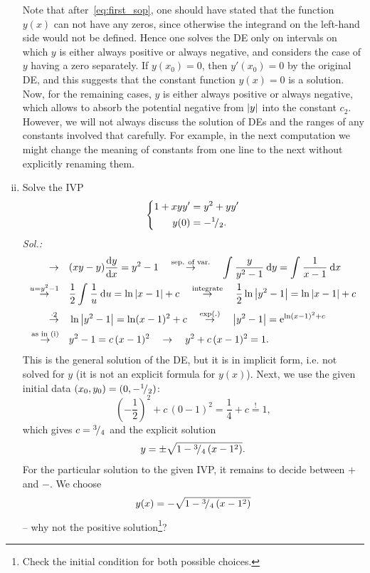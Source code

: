 \begin{example}
\begin{enumerate}[(i)]
	Note that after~\eqref{eq:first_sop}, one should have stated that the function $y(x)$ can not have any zeros, since otherwise the integrand on the left-hand side would not be defined. Hence one solves the DE only on intervals on which $y$ is either always positive or always negative, and considers the case of $y$ having a zero separately. If $y(x_0)=0$, then $y'(x_0)=0$ by the original DE, and this suggests that the constant function $y(x)=0$ is a solution. Now, for the remaining cases, $y$ is either always positive or always negative, which allows to absorb the potential negative from $\left| y \right|$ into the constant $c_2$. However, we will not always discuss the solution of DEs and the ranges of any constants involved that carefully. For example, in the next computation we might change the meaning of constants from one line to the next without explicitly renaming them.
	\item Solve the IVP
	\[ \left\{ \begin{split} 1+xyy' & = y^2+yy' \\ y(0) & = -{}^{1}\!/_{2}. \end{split} \right. \]
	{\it Sol.:}
	\begin{equation*}
	\begin{split}
	\rightarrow & \quad (xy-y)\displaystyle{\frac{\mathrm{d}y}{\mathrm{d}x}} 
	= y^2-1 \quad \stackrel{\text{sep. of var.}}{\rightarrow} \quad
	\int_{}^{} \frac{y}{y^2-1} \: \mathrm{d} y = \int_{}^{} \frac{1}{x-1} \: \mathrm{d} x \\
	\stackrel{u=y^2-1}{\rightarrow} & \quad \frac12 \int_{}^{} \frac1u \: \mathrm{d} u = \ln\left| x-1 \right|+c \quad
	\stackrel{\text{integrate}}{\rightarrow} \quad \frac12\ln\left| y^2-1 \right| = \ln\left| x-1 \right| + c \\ 
	\stackrel{\cdot 2}{\rightarrow} & \quad \ln\left| y^2-1 \right| = \ln(x-1)^2+c \quad 
	\stackrel{\exp(.)}{\rightarrow} \quad \left| y^2-1 \right| = \mathrm{e}^{\ln(x-1)^2+c} \\
	\stackrel{\text{as in (i)}}{\rightarrow} & \quad y^2-1 = c\,(x-1)^2 \quad
	\rightarrow \quad y^2+c\,(x-1)^2=1.
	\end{split}
	\end{equation*}
	This is the general solution of the DE, but it is in implicit form, i.e. not solved for $y$ (it is not an explicit formula for $y(x)$). Next, we use the given initial data $(x_0,y_0)=(0,-{}^{1}\!/_{2})$:
	\[ \left(-\frac12\right)^2+c\,(0-1)^2 = \frac14+c\stackrel{!}{=} 1, \]
	which gives $c={}^{3}\!/_{4}$ and the explicit solution
	\[ y=\pm \sqrt{1-{}^{3}\!/_{4}\,(x-1^2)}. \]
	For the particular solution to the given IVP, it remains to decide between $+$ and $-$. We choose
	\[ y(x) = -\sqrt{1-{}^{3}\!/_{4}\,(x-1^2)} \]
	-- why not the positive solution\footnote{Check the initial condition for both possible choices.}?
\end{enumerate}
\end{example}

